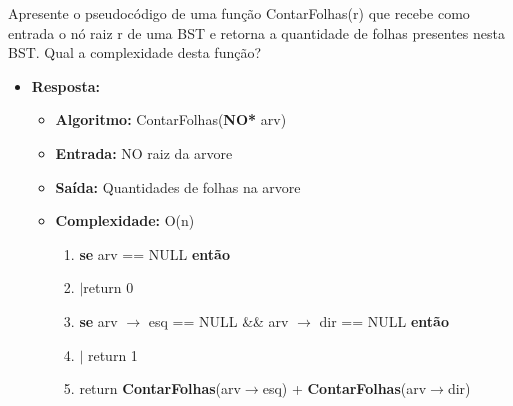 Apresente o pseudocódigo de uma função
 ContarFolhas(r) que recebe como entrada o nó
raiz r de uma BST e retorna a quantidade de folhas presentes nesta BST. Qual a complexidade
desta função?

\begin{itemize}
	\item \textbf{Resposta:}
	
	\begin{itemize}
		\item \textbf{Algoritmo:} ContarFolhas(\textbf{NO*} arv)
		\item \textbf{Entrada:} NO raiz da arvore
		\item \textbf{Saída:}
		Quantidades de folhas na arvore
		\item \textbf{Complexidade:} O(n)
		
		\begin{enumerate}[1--]
			\item \textbf{se} arv == NULL \textbf{então}
			\item $|$\quad return 0
			\item \textbf{se} arv $\rightarrow$ esq == NULL \&\& arv  $\rightarrow$ dir == NULL \textbf{então}
			\item $|$ \quad return 1
			\item return \textbf{ContarFolhas}(arv$\rightarrow$esq) + \textbf{ContarFolhas}(arv$\rightarrow$dir)
		\end{enumerate}
	\end{itemize}
\end{itemize}
